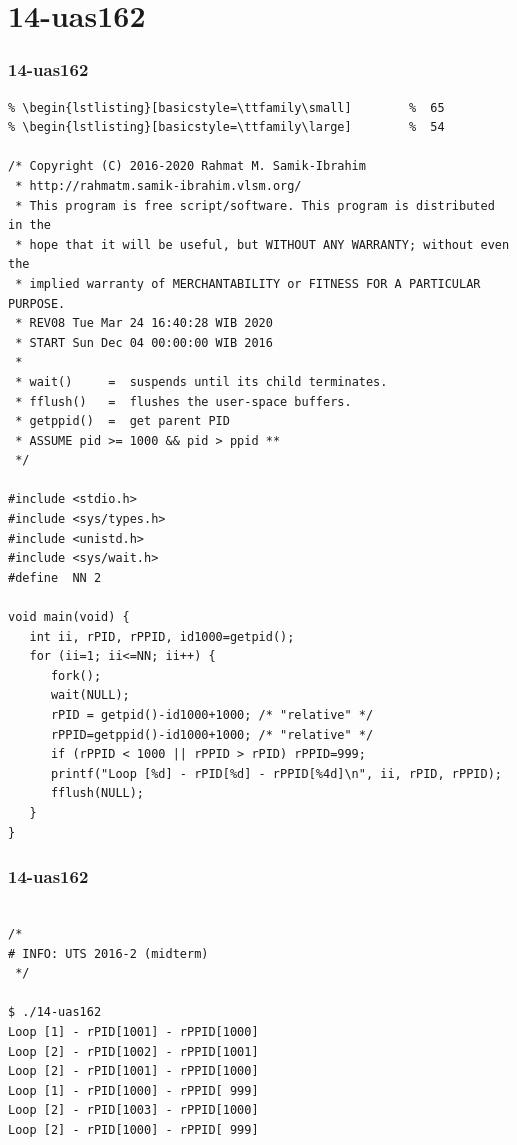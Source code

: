 \documentclass[xcolor=table, notheorems, hyperref={pdfpagelabels=false}]{beamer}
\begin{document}
\section{14-uas162}
\begin{frame}[fragile]
\frametitle{14-uas162}
\begin{lstlisting}[basicstyle=\ttfamily\tiny]         % 108
% \begin{lstlisting}[basicstyle=\ttfamily\footnotesize] %  72
% \begin{lstlisting}[basicstyle=\ttfamily\small]        %  65
% \begin{lstlisting}[basicstyle=\ttfamily\large]        %  54

/* Copyright (C) 2016-2020 Rahmat M. Samik-Ibrahim
 * http://rahmatm.samik-ibrahim.vlsm.org/
 * This program is free script/software. This program is distributed in the 
 * hope that it will be useful, but WITHOUT ANY WARRANTY; without even the 
 * implied warranty of MERCHANTABILITY or FITNESS FOR A PARTICULAR PURPOSE.
 * REV08 Tue Mar 24 16:40:28 WIB 2020
 * START Sun Dec 04 00:00:00 WIB 2016
 *
 * wait()     =  suspends until its child terminates. 
 * fflush()   =  flushes the user-space buffers.
 * getppid()  =  get parent PID
 * ASSUME pid >= 1000 && pid > ppid **
 */

#include <stdio.h>
#include <sys/types.h>
#include <unistd.h>
#include <sys/wait.h>
#define  NN 2

void main(void) {
   int ii, rPID, rPPID, id1000=getpid();
   for (ii=1; ii<=NN; ii++) {
      fork();
      wait(NULL);
      rPID = getpid()-id1000+1000; /* "relative" */
      rPPID=getppid()-id1000+1000; /* "relative" */
      if (rPPID < 1000 || rPPID > rPID) rPPID=999;
      printf("Loop [%d] - rPID[%d] - rPPID[%4d]\n", ii, rPID, rPPID);
      fflush(NULL);
   }
}

\end{lstlisting}
\end{frame}

\begin{frame}[fragile]
\frametitle{14-uas162}
\begin{lstlisting}[basicstyle=\ttfamily\large]        %  54

/*
# INFO: UTS 2016-2 (midterm)
 */

$ ./14-uas162 
Loop [1] - rPID[1001] - rPPID[1000]
Loop [2] - rPID[1002] - rPPID[1001]
Loop [2] - rPID[1001] - rPPID[1000]
Loop [1] - rPID[1000] - rPPID[ 999]
Loop [2] - rPID[1003] - rPPID[1000]
Loop [2] - rPID[1000] - rPPID[ 999]

\end{lstlisting}
\end{frame}
\end{document}
